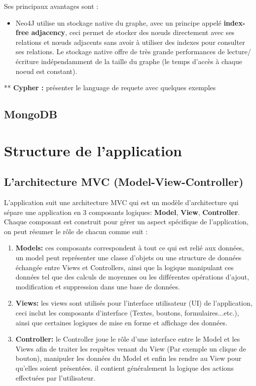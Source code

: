 Ses principaux avantages sont :
\begin{itemize}
	\item Neo4J utilise un stockage native du graphe, avec un principe appelé \textbf{index-free adjacency}, ceci permet de stocker des nœuds directement avec ses relations et nœuds adjacents sans avoir à utiliser des indexes pour consulter ses relations.\newline
	Le stockage native offre de très grande performances de lecture/écriture indépendamment de la taille du graphe (le temps d'accès à chaque noeud est constant).
\end{itemize}


** \textbf{Cypher : } présenter le language de requete avec quelques exemples
\subsection{MongoDB}
		
\section{Structure de l'application}
\subsection{L'architecture MVC (Model-View-Controller)}
L'application suit une architecture MVC qui est un modèle d'architecture qui sépare une application en 3 composants logiques: \textbf{Model}, \textbf{View}, \textbf{Controller}.
Chaque composant est construit pour gérer un aspect spécifique de l'application, on peut résumer le rôle de chacun comme suit :
\begin{enumerate}
	\item \textbf{Models: } ces composants correspondent à tout ce qui est relié aux données, un model peut représenter une classe d'objets ou une structure de données échangée entre Views et Controllers, ainsi que la logique manipulant ces données tel que des calculs de moyennes ou les différentes opérations d'ajout, modification et suppression dans une base de données.
	\item \textbf{Views:} les views sont utilisés pour l'interface utilisateur (UI) de l'application, ceci inclut les composants d'interface (Textes, boutons, formulaires...etc.), ainsi que certaines logiques de mise en forme et affichage des données.
	\item \textbf{Controller: } le Controller joue le rôle d'une interface entre le Model et les Views afin de traiter les requêtes venant du View (Par exemple un clique de bouton), manipuler les données du Model et enfin les rendre au View pour qu'elles soient présentées. il contient généralement la logique des actions effectuées par l'utilisateur.
\end{enumerate}
	
